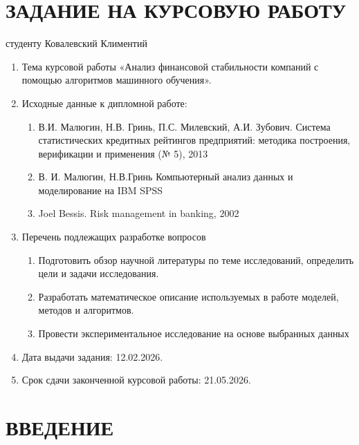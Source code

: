 \documentclass[14pt,a4paper]{extarticle}
\begin{document}
\clearpage
{}
\setcounter{page}{2}

\tableofcontents
\clearpage

\section*{ЗАДАНИЕ НА КУРСОВУЮ РАБОТУ}
студенту Ковалевский Климентий
\begin{enumerate}
    \item Тема курсовой работы «Анализ финансовой стабильности компаний с помощью 
    алгоритмов машинного обучения». 
    \item Исходные данные к дипломной работе: 
    \begin{enumerate}[label=\arabic*.\arabic*]
        \item В.И. Малюгин, Н.В. Гринь, П.С. Милевский, А.И. Зубович. Система 
            статистических кредитных рейтингов предприятий: методика построения, 
            верификации и применения (№ 5), 2013
        \item В. И. Малюгин, Н.В.Гринь Компьютерный анализ данных и моделирование на IBM SPSS
        \item Joel Bessis. Risk management in banking, 2002
    \end{enumerate}
    \item Перечень подлежащих разработке вопросов 
    \begin{enumerate}[label=\arabic*.\arabic*]
        \item Подготовить обзор научной литературы по теме исследований, определить 
цели и задачи исследования.
        \item Разработать математическое описание используемых в работе моделей, 
методов и алгоритмов.
        \item Провести экспериментальное исследование на основе выбранных данных
    \end{enumerate}
    \item Дата выдачи задания: 12.02.2026.
    \item Срок сдачи законченной курсовой работы: 21.05.2026.
\end{enumerate}

\clearpage

\section*{ВВЕДЕНИЕ}
\end{document}
